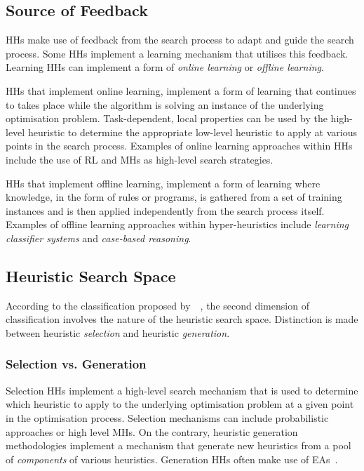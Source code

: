 \subsection{Source of Feedback}

\acp{HH} make use of feedback from the search process to adapt and guide the search process. Some \acp{HH} implement a learning mechanism that utilises this feedback. Learning \acp{HH} can implement a form of \textit{online learning} or \textit{offline learning}.

\acp{HH} that implement online learning, implement a form of learning that continues to takes place while the algorithm is solving an instance of the underlying optimisation problem. Task-dependent, local properties can be used by the high-level heuristic to determine the appropriate low-level heuristic to apply at various points in the search process. Examples of online learning approaches within \acp{HH} include the use of \acf{RL} and \acfp{MH} as high-level search strategies.

\acp{HH} that implement offline learning, implement a form of learning where knowledge, in the form of rules or programs, is gathered from a set of training instances and is then applied independently from the search process itself. Examples of offline learning approaches within hyper-heuristics include \textit{learning classifier systems} and \textit{case-based reasoning}.

\subsection{Heuristic Search Space}
According to the classification proposed by~\citeauthor{ref:burke:2010}~\cite{ref:burke:2010}, the second dimension of classification involves the nature of the heuristic search space. Distinction is made between heuristic \textit{selection} and heuristic \textit{generation}.

\subsubsection{Selection vs. Generation}

Selection \acp{HH} implement a high-level search mechanism that is used to determine which heuristic to apply to the underlying optimisation problem at a given point in the optimisation process. Selection mechanisms can include probabilistic approaches or high level \acfp{MH}. On the contrary, heuristic generation methodologies implement a mechanism that generate new heuristics from a pool of \textit{components} of various heuristics. Generation \acp{HH} often make use of \acfp{EA}~\cite{ref:burke:2010}.

